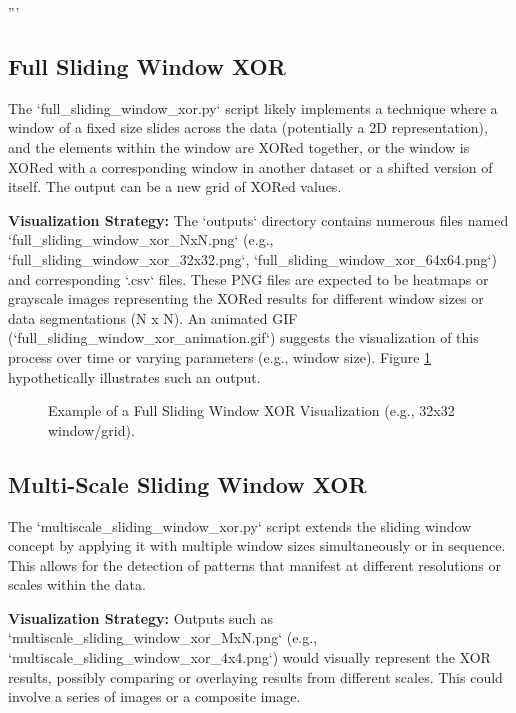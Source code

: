 '''\documentclass[conference]{IEEEtran}
\begin{document}
\subsection{Full Sliding Window XOR}
The `full_sliding_window_xor.py` script likely implements a technique where a window of a fixed size slides across the data (potentially a 2D representation), and the elements within the window are XORed together, or the window is XORed with a corresponding window in another dataset or a shifted version of itself. The output can be a new grid of XORed values.

\textbf{Visualization Strategy:} The `outputs` directory contains numerous files named `full_sliding_window_xor_NxN.png` (e.g., `full_sliding_window_xor_32x32.png`, `full_sliding_window_xor_64x64.png`) and corresponding `.csv` files. These PNG files are expected to be heatmaps or grayscale images representing the XORed results for different window sizes or data segmentations (N x N). An animated GIF (`full_sliding_window_xor_animation.gif`) suggests the visualization of this process over time or varying parameters (e.g., window size). Figure \ref{fig:sliding_window_example} hypothetically illustrates such an output.

\begin{figure}[htbp]
    \centering
    \caption{Example of a Full Sliding Window XOR Visualization (e.g., 32x32 window/grid).}
    \label{fig:sliding_window_example}
\end{figure}

\subsection{Multi-Scale Sliding Window XOR}
The `multiscale_sliding_window_xor.py` script extends the sliding window concept by applying it with multiple window sizes simultaneously or in sequence. This allows for the detection of patterns that manifest at different resolutions or scales within the data.

\textbf{Visualization Strategy:} Outputs such as `multiscale_sliding_window_xor_MxN.png` (e.g., `multiscale_sliding_window_xor_4x4.png`) would visually represent the XOR results, possibly comparing or overlaying results from different scales. This could involve a series of images or a composite image.
\end{document}
